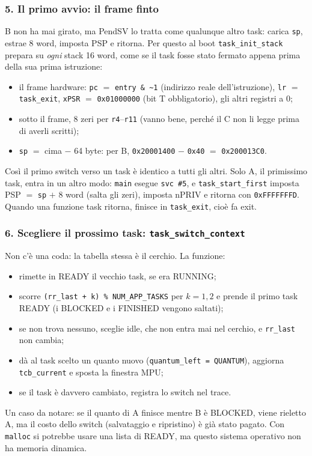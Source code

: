 \subsubsection*{5. Il primo avvio: il frame finto}
B non ha mai girato, ma PendSV lo tratta come qualunque altro task: carica \texttt{sp}, estrae 8 word, imposta PSP e ritorna. Per questo al boot \texttt{task\_init\_stack} prepara su \emph{ogni} stack 16 word, come se il task fosse stato fermato appena prima della sua prima istruzione:
\begin{itemize}
    \item il frame hardware: \texttt{pc} $=$ \texttt{entry \& \textasciitilde 1} (indirizzo reale dell'istruzione), \texttt{lr} $=$ \texttt{task\_exit}, \texttt{xPSR} $=$ \texttt{0x01000000} (bit T obbligatorio), gli altri registri a 0;
    \item sotto il frame, 8 zeri per \texttt{r4}--\texttt{r11} (vanno bene, perché il C non li legge prima di averli scritti);
    \item \texttt{sp} $=$ cima $-$ 64 byte: per B, \texttt{0x20001400} $-$ \texttt{0x40} $=$ \texttt{0x200013C0}.
\end{itemize}
Così il primo switch verso un task è identico a tutti gli altri. Solo A, il primissimo task, entra in un altro modo: \texttt{main} esegue \texttt{svc \#5}, e \texttt{task\_start\_first} imposta PSP $=$ \texttt{sp} $+$ 8 word (salta gli zeri), imposta nPRIV e ritorna con \texttt{0xFFFFFFFD}. Quando una funzione task ritorna, finisce in \texttt{task\_exit}, cioè fa exit.

\subsubsection*{6. Scegliere il prossimo task: \texttt{task\_switch\_context}}
Non c'è una coda: la tabella stessa è il cerchio. La funzione:
\begin{itemize}
    \item rimette in READY il vecchio task, se era RUNNING;
    \item scorre \texttt{(rr\_last + k) \% NUM\_APP\_TASKS} per $k = 1, 2$ e prende il primo task READY (i BLOCKED e i FINISHED vengono saltati);
    \item se non trova nessuno, sceglie idle, che non entra mai nel cerchio, e \texttt{rr\_last} non cambia;
    \item dà al task scelto un quanto nuovo (\texttt{quantum\_left = QUANTUM}), aggiorna \texttt{tcb\_current} e sposta la finestra MPU;
    \item se il task è davvero cambiato, registra lo switch nel trace.
\end{itemize}
Un caso da notare: se il quanto di A finisce mentre B è BLOCKED, viene rieletto A, ma il costo dello switch (salvataggio e ripristino) è già stato pagato. Con \texttt{malloc} si potrebbe usare una lista di READY, ma questo sistema operativo non ha memoria dinamica.

